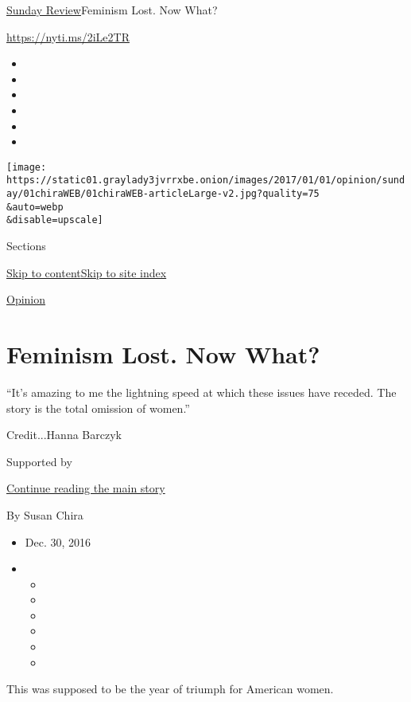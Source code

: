 \href{/section/opinion/sunday}{Sunday Review}\textbar{}Feminism Lost.
Now What?

\url{https://nyti.ms/2iLe2TR}

\begin{itemize}
\item
\item
\item
\item
\item
\item
\end{itemize}

\texttt{[image: https://static01.graylady3jvrrxbe.onion/images/2017/01/01/opinion/sunday/01chiraWEB/01chiraWEB-articleLarge-v2.jpg?quality=75\\\&auto=webp\\\&disable=upscale]}

Sections

\protect\hyperlink{site-content}{Skip to
content}\protect\hyperlink{site-index}{Skip to site index}

\href{/section/opinion}{Opinion}

\hypertarget{feminism-lost-now-what}{%
\section{Feminism Lost. Now What?}\label{feminism-lost-now-what}}

``It's amazing to me the lightning speed at which these issues have
receded. The story is the total omission of women.''

Credit...Hanna Barczyk

Supported by

\protect\hyperlink{after-sponsor}{Continue reading the main story}

By Susan Chira

\begin{itemize}
\item
  Dec. 30, 2016
\item
  \begin{itemize}
  \item
  \item
  \item
  \item
  \item
  \item
  \end{itemize}
\end{itemize}

This was supposed to be the year of triumph for American women.

